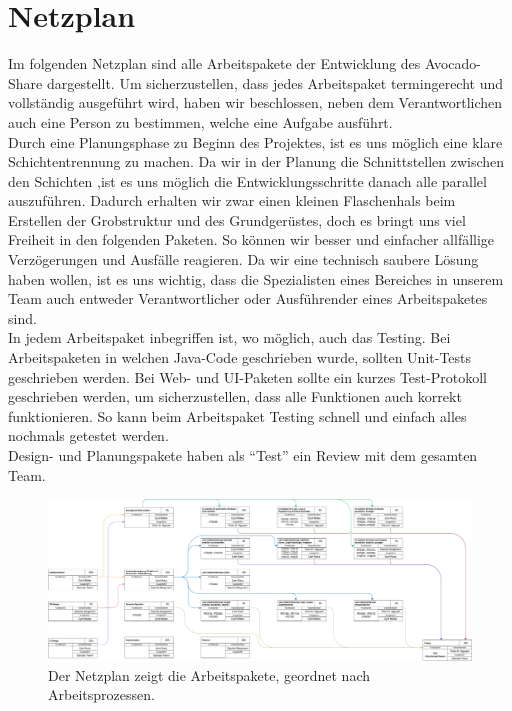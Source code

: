 \section{Netzplan}
Im folgenden Netzplan sind alle Arbeitspakete der Entwicklung des Avocado-Share dargestellt. 
Um sicherzustellen, dass jedes Arbeitspaket termingerecht und vollständig ausgeführt wird, haben wir beschlossen, neben dem Verantwortlichen auch eine Person zu bestimmen, welche eine Aufgabe ausführt.\\

Durch eine Planungsphase zu Beginn des Projektes, ist es uns möglich eine klare Schichtentrennung zu machen.
Da wir in der Planung die Schnittstellen zwischen den Schichten ,ist es uns möglich die Entwicklungsschritte danach
alle parallel auszuführen. Dadurch erhalten wir zwar einen kleinen Flaschenhals beim Erstellen der Grobstruktur und des
Grundgerüstes, doch es bringt uns viel Freiheit in den folgenden Paketen. So können wir besser und einfacher allfällige
Verzögerungen und Ausfälle reagieren.
Da wir eine technisch saubere Lösung haben wollen, ist es uns wichtig, dass die Spezialisten eines Bereiches in unserem Team auch entweder Verantwortlicher oder Ausführender eines Arbeitspaketes sind. \\

In jedem Arbeitspaket inbegriffen ist, wo möglich, auch das Testing.
Bei Arbeitspaketen in welchen Java-Code geschrieben wurde, sollten Unit-Tests geschrieben werden.
Bei Web- und UI-Paketen sollte ein kurzes Test-Protokoll geschrieben werden, um sicherzustellen, dass alle Funktionen auch korrekt funktionieren.
So kann beim Arbeitspaket Testing schnell und einfach alles nochmals getestet werden.\\

Design- und Planungspakete haben als "`Test"' ein Review mit dem gesamten Team.

\begin{landscape}
\vspace*{\fill}
\begin{figure}[H]
\includegraphics[width=\linewidth]{graphics/netzplan_s2.pdf}
\caption{Der Netzplan zeigt die Arbeitspakete, geordnet nach Arbeitsprozessen.}
\end{figure}
\vspace*{\fill}
\end{landscape}

